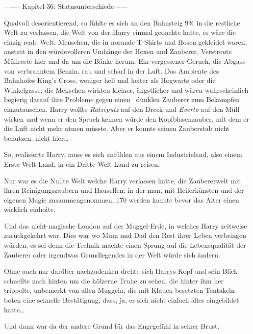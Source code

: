 

\hypertarget{statusunterschiede}{%

—\/-\/-\/-\/- Kapitel 36: Statusunterschiede -\/-\/-\/-\/-

Qualvoll desorientierend, so fühlte es sich an den Bahnsteig 9¾ in die restliche Welt zu verlassen, die Welt von der Harry einmal gedachte hatte, es wäre die einzig reale Welt. Menschen, die in normale T-Shirts und Hosen gekleidet waren, anstatt in den würdevolleren Umhänge der Hexen und Zauberer. Verstreute Müllreste hier und da um die Bänke herum. Ein vergessener Geruch, die Abgase von verbranntem Benzin, rau und scharf in der Luft. Das Ambiente des Bahnhofes King's Cross, weniger hell und heiter als Hogwarts oder die Winkelgasse; die Menschen wirkten kleiner, ängstlicher und wären wahrscheinlich begierig darauf ihre Probleme gegen einen ~dunklen Zauberer zum Bekämpfen einzutauschen. Harry wollte \emph{Ratzeputz} auf den Dreck und \emph{Everto} auf den Müll wirken und wenn er den Spruch kennen würde den Kopfblasenzauber, mit dem er die Luft nicht mehr atmen müsste. Aber er konnte seinen Zauberstab nicht benutzen, nicht hier…

So, realisierte Harry, muss es sich anfühlen aus einem Industrieland, also einem Erste Welt Land, in ein Dritte Welt Land zu reisen.

Nur war es die Nullte Welt welche Harry verlassen hatte, die Zaubererwelt mit ihren Reinigungszaubern und Hauselfen; in der man, mit Heilerkünsten und der eigenen Magie zusammengenommen, 170 werden konnte bevor das Alter einen wirklich einholte.

Und das nicht-magische London auf der Muggel-Erde, in welches Harry zeitweise zurückgekehrt war. Dies war wo Mum und Dad den Rest ihrer Leben verbringen würden, es sei denn die Technik machte einen Sprung auf die Lebensqualität der Zauberer oder irgendwas Grundlegendes in der Welt würde sich ändern.

Ohne auch nur darüber nachzudenken drehte sich Harrys Kopf und sein Blick schnellte nach hinten um die hölzerne Truhe zu sehen, die hinter ihm her trippelte, unbemerkt von allen Muggeln, die mit Klauen besetzten Tentakeln boten eine schnelle Bestätigung, dass, ja, er sich nicht einfach alles eingebildet hatte…

Und dann war da der andere Grund für das Engegefühl in seiner Brust.

}
